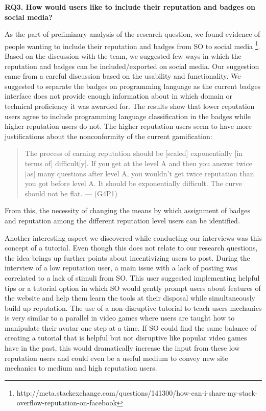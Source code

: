 \documentclass{sigchi}
\begin{document}
\textbf{RQ3. How would users like to include their reputation and badges on social media?}

As the part of preliminary analysis of the research question, we found evidence of people wanting to include their reputation and badges from SO to social media \footnote{http://meta.stackexchange.com/questions/141300/how-can-i-share-my-stack-overflow-reputation-on-facebook}. Based on the discussion with the team, we suggested few ways in which the reputation and badges can be included/exported on social media. Our suggestion came from a careful discussion based on the usability and functionality. We suggested to separate the badges on programming language as the current badges interface does not provide enough information about in which domain or technical proficiency it was awarded for. The results show that lower reputation users agree to include programming language classification in the badges while higher reputation users do not. The higher reputation users seem to have more justifications about the nonconformity of the current gamification:

\begin{quote}
The process of earning reputation should be [scaled] exponentially [in terms of] difficult[y]. If you get at the level A and then you answer twice [as] many questions after level A, you wouldn't get twice reputation than you got before level A. It should be exponentially difficult. The curve should not be flat. --- (G4P1)
\end{quote}

From this, the necessity of changing the means by which assignment of badges and reputation among the different reputation level users can be identified.

Another interesting aspect we discovered while conducting our interviews was this concept of a tutorial. Even though this does not relate to our research questions, the idea brings up further points about incentivizing users to post. During the interview of a low reputation user, a main issue with a lack of posting was correlated to a lack of stimuli from SO. This user suggested implementing helpful tips or a tutorial option in which SO would gently prompt users about features of the website and help them learn the tools at their disposal while simultaneously build up reputation. The use of a non-disruptive tutorial to teach users mechanics is very similar to a parallel in video games where users are taught how to manipulate their avatar one step at a time. If SO could find the same balance of creating a tutorial that is helpful but not disruptive like popular video games have in the past, this would dramatically increase the input from these low reputation users and could even be a useful medium to convey new site mechanics to medium and high reputation users.
\end{document}
